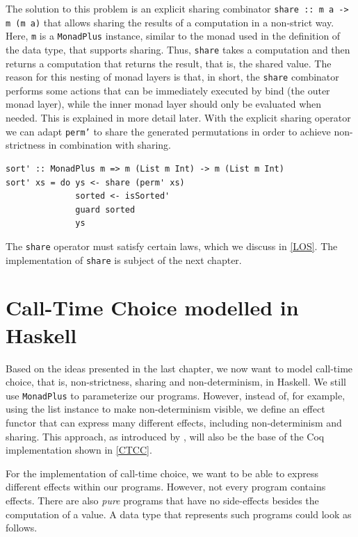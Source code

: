\documentclass[a4paper, 11pt, fleqn, twoside]{scrreprt}
\newcommand{\todo}[1]{\marginpar{\textbf{TODO:} #1}}
\begin{document}
The solution to this problem is an explicit sharing combinator 
\texttt{share :: m a -> m (m a)} that allows sharing the results 
of a computation in a non-strict way. Here, \texttt{m} is a 
\texttt{MonadPlus} instance, similar to the monad used in the 
definition of the data type, that supports sharing. Thus, 
\texttt{share} takes a  computation and then returns a computation 
that returns the result, that is, the shared value. The reason for this nesting 
of monad layers is that, in short, the \texttt{share} combinator 
performs some actions that can be immediately executed by bind (the outer monad 
layer), while the inner monad layer should only be evaluated when needed. This 
is explained in more detail later.
With the explicit sharing operator we can adapt \texttt{perm'} to
share the generated permutations in order to achieve non-strictness in 
combination with sharing.

\begin{verbatim}
sort' :: MonadPlus m => m (List m Int) -> m (List m Int)
sort' xs = do ys <- share (perm' xs)
              sorted <- isSorted'
              guard sorted
              ys
\end{verbatim}

The \texttt{share} operator must satisfy certain laws, which we 
discuss in \autoref{LOS}. The implementation of \texttt{share} is 
subject of the next chapter.

\chapter{Call-Time Choice modelled in Haskell}
Based on the ideas presented in the last chapter, we now want to model 
call-time choice, that is, non-strictness, sharing and non-determinism, in 
Haskell. We still use \texttt{MonadPlus} to parameterize our 
programs. However, instead of, for example, using the list instance to make 
non-determinism visible, we define an effect functor that can express many 
different effects, including non-determinism and sharing. This approach, as 
introduced by \citep{effectHandlersScope}, will also be the base of the Coq 
implementation shown in \autoref{CTCC}. \todo{Definition effect}

For the implementation of call-time choice, we want to be able to express 
different effects within our programs. However, not every program contains 
effects. There are also \textit{pure} programs that have no side-effects 
besides the computation of a value. A data type that represents such programs 
could look as follows.
\end{document}
